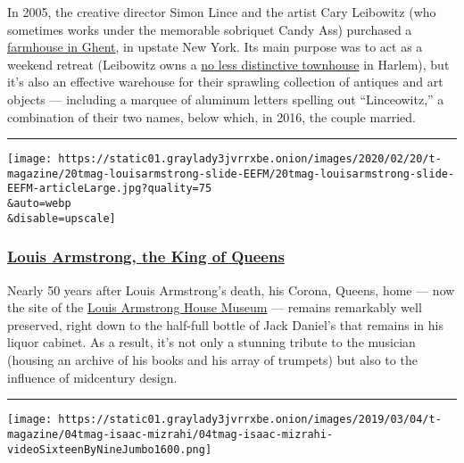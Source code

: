In 2005, the creative director Simon Lince and the artist Cary Leibowitz
(who sometimes works under the memorable sobriquet Candy Ass) purchased
a
\href{https://www.nytimes3xbfgragh.onion/2017/10/23/t-magazine/columbia-county-gay-utopia-new-york.html}{farmhouse
in Ghent}, in upstate New York. Its main purpose was to act as a weekend
retreat (Leibowitz owns a
\href{https://www.nytimes3xbfgragh.onion/video/t-magazine/design/100000005955125/house-tour-cary-leibowitz.html?playlistId=video/house-tours}{no
less distinctive townhouse} in Harlem), but it's also an effective
warehouse for their sprawling collection of antiques and art objects ---
including a marquee of aluminum letters spelling out ``Linceowitz,'' a
combination of their two names, below which, in 2016, the couple
married.

\begin{center}\rule{0.5\linewidth}{\linethickness}\end{center}

\texttt{[image: https://static01.graylady3jvrrxbe.onion/images/2020/02/20/t-magazine/20tmag-louisarmstrong-slide-EEFM/20tmag-louisarmstrong-slide-EEFM-articleLarge.jpg?quality=75\\\&auto=webp\\\&disable=upscale]}

\hypertarget{louis-armstrong-the-king-of-queens}{%
\subsubsection{\texorpdfstring{\textbf{\href{https://www.nytimes3xbfgragh.onion/2020/02/20/t-magazine/louis-armstrong-home-queens.html}{Louis
Armstrong, the King of
Queens}}}{Louis Armstrong, the King of Queens}}\label{louis-armstrong-the-king-of-queens}}

Nearly 50 years after Louis Armstrong's death, his Corona, Queens, home
--- now the site of the
\href{https://www.louisarmstronghouse.org/}{Louis Armstrong House
Museum} --- remains remarkably well preserved, right down to the
half-full bottle of Jack Daniel's that remains in his liquor cabinet. As
a result, it's not only a stunning tribute to the musician (housing an
archive of his books and his array of trumpets) but also to the
influence of midcentury design.

\begin{center}\rule{0.5\linewidth}{\linethickness}\end{center}

\texttt{[image: https://static01.graylady3jvrrxbe.onion/images/2019/03/04/t-magazine/04tmag-isaac-mizrahi/04tmag-isaac-mizrahi-videoSixteenByNineJumbo1600.png]}

